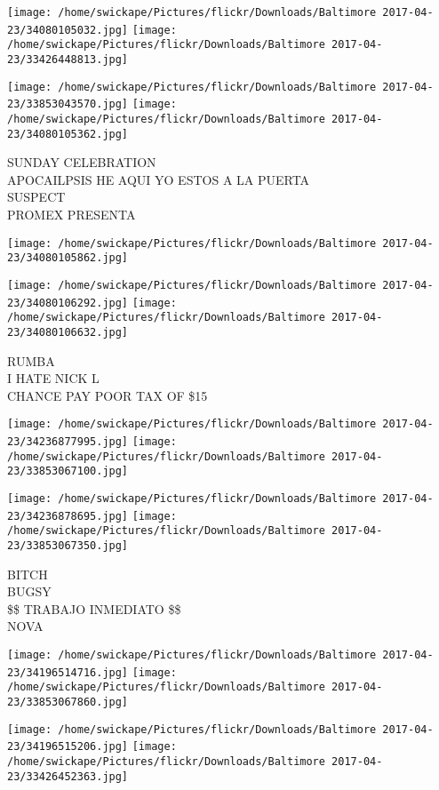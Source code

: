 \documentclass[10pt,letterpaper]{article}
\begin{document}
\texttt{[image: /home/swickape/Pictures/flickr/Downloads/Baltimore 2017-04-23/34080105032.jpg]}
\texttt{[image: /home/swickape/Pictures/flickr/Downloads/Baltimore 2017-04-23/33426448813.jpg]}

\texttt{[image: /home/swickape/Pictures/flickr/Downloads/Baltimore 2017-04-23/33853043570.jpg]}
\texttt{[image: /home/swickape/Pictures/flickr/Downloads/Baltimore 2017-04-23/34080105362.jpg]}

SUNDAY CELEBRATION\\
APOCAILPSIS HE AQUI YO ESTOS A LA PUERTA\\
SUSPECT\\
PROMEX PRESENTA
\pagebreak

\texttt{[image: /home/swickape/Pictures/flickr/Downloads/Baltimore 2017-04-23/34080105862.jpg]}

\vspace{0.25in}
\texttt{[image: /home/swickape/Pictures/flickr/Downloads/Baltimore 2017-04-23/34080106292.jpg]}
\texttt{[image: /home/swickape/Pictures/flickr/Downloads/Baltimore 2017-04-23/34080106632.jpg]}

RUMBA\\
I HATE NICK L\\
CHANCE PAY POOR TAX OF \$15
\pagebreak

\texttt{[image: /home/swickape/Pictures/flickr/Downloads/Baltimore 2017-04-23/34236877995.jpg]}
\texttt{[image: /home/swickape/Pictures/flickr/Downloads/Baltimore 2017-04-23/33853067100.jpg]}

\texttt{[image: /home/swickape/Pictures/flickr/Downloads/Baltimore 2017-04-23/34236878695.jpg]}
\texttt{[image: /home/swickape/Pictures/flickr/Downloads/Baltimore 2017-04-23/33853067350.jpg]}

BITCH\\
BUGSY\\
\$\$ TRABAJO INMEDIATO \$\$\\
NOVA
\pagebreak

\texttt{[image: /home/swickape/Pictures/flickr/Downloads/Baltimore 2017-04-23/34196514716.jpg]}
\texttt{[image: /home/swickape/Pictures/flickr/Downloads/Baltimore 2017-04-23/33853067860.jpg]}

\texttt{[image: /home/swickape/Pictures/flickr/Downloads/Baltimore 2017-04-23/34196515206.jpg]}
\texttt{[image: /home/swickape/Pictures/flickr/Downloads/Baltimore 2017-04-23/33426452363.jpg]}
\end{document}
